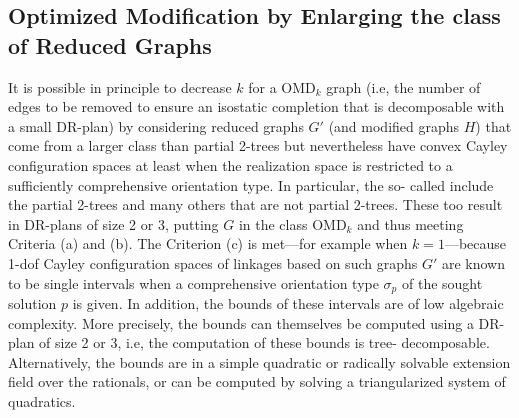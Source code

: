 \subsection{Optimized Modification by Enlarging the class of Reduced
Graphs}
\label{sec:tdecomp}
%
It is possible in principle to decrease $k$ for a OMD$_k$ graph (i.e,
the number of edges to be removed to ensure an isostatic completion
that is decomposable with a small DR-plan) by considering reduced
graphs $G'$ (and modified graphs $H$) that come from a larger class
than partial 2-trees but nevertheless have convex Cayley configuration
spaces at least when the realization space is restricted to a
sufficiently comprehensive orientation type. In particular, the so-
called 
\uncited include the partial 2-trees and many others that are not
partial 2-trees. These too result in DR-plans of size 2 or 3, putting
$G$ in the class OMD$_k$ and thus meeting Criteria (a) and (b). The
Criterion (c) is met---for example when $k=1$---because 1-dof Cayley
configuration spaces of linkages based on such graphs $G'$ are known
to be single intervals when a comprehensive orientation type
$\sigma_p$ of the sought solution $p$ is given. In addition, the
bounds of these intervals are of low algebraic complexity. More
precisely, the bounds  can themselves be computed using a DR-plan of
size 2 or 3, i.e, the computation of these bounds is tree-
decomposable. Alternatively, the bounds are in a simple quadratic or
radically solvable extension field over the rationals, or can be
computed by solving a triangularized system of quadratics.
